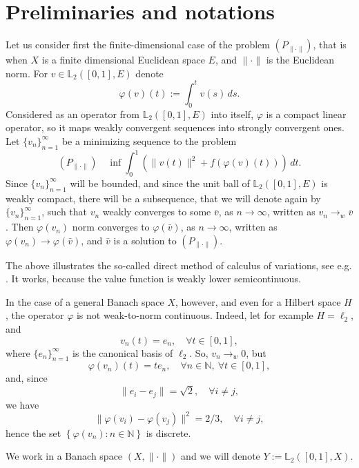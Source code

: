 \documentclass[12pt,leqno]{article}
\theoremstyle{definition}
\theoremstyle{remark}
\def\L{\mathbb{L}}
\begin{document}
 \section{Preliminaries and notations}\label{sec:prelim}


Let us consider first the finite-dimensional case of the problem  $\left(P_{\|\cdot\|}\right)$, that is when $X$ is a finite dimensional Euclidean space $E$,  and $\|\cdot\|$ is the Euclidean norm.
For $v\in  \L_2([0,1], E)$ denote
$$
  \varphi (v)(t):=\int_0^t v(s) \, ds.
$$
Considered as an operator from $\L_2([0,1], E)$ into itself, $\varphi$ is  a compact linear operator, so it maps weakly convergent sequences into strongly convergent ones. Let $\{v_n\}_{n=1}^{\infty}$ be a minimizing sequence to the problem
$$
\left(P_{\|\cdot\|}\right)\quad  \inf \int_0^1 (\|v(t)\|^2+f(\varphi(v)(t))) \, dt .
$$
Since $\{v_n\}_{n=1}^{\infty}$ will be bounded, and since the unit ball of $\L_2([0,1], E)$ is weakly compact, there will be  a subsequence,  that we will denote again by $\{v_n\}_{n=1}^{\infty}$, such that $v_n$ weakly converges to some $\bar v$, as $n \rightarrow \infty$, written as $v_n\to_w \bar v$. Then $\varphi (v_n) $ norm converges to $\varphi(\bar v)$,  as $n \rightarrow \infty$, written as
$
    \varphi (v_n) \rightarrow \varphi(\bar v)$,
and $\bar v$ is a solution to $(P_{\| \cdot \|})$.

\medskip

The above illustrates the so-called direct method of calculus of variations, see e.g. \cite{clarke_functional_analysis,dacorogna_direct_methods,giusti_direct_methods}. It works, because the value function is weakly lower semicontinuous.

In the case of a general Banach space $X$, however, and even for a Hilbert space $H$,  the operator $\varphi$ is not weak-to-norm continuous.
Indeed, let for example  $H=\ell_2$, and
$$
    v_n(t)=e_n, \quad \forall t \in[0,1],
$$
where $\{e_n\}_{n=1}^\infty$ is the canonical basis of $\ell_2$.
So,  $v_n \to_w 0$, but
$$
    \varphi(v_n)(t)=t e_n, \quad \forall n \in \mathbb{N},\ \forall t\in[0,1],
$$
and, since
$$
    \|e_i-e_j\|=\sqrt{2}, \quad \forall i \neq j,
$$
we have
$$
   \|\varphi(v_i)-\varphi(v_j)\|^2=2/3, \quad \forall i \neq j,
$$
hence the set $\left\{\varphi\left(v_n\right): n \in \mathbb{N}\right\}$ is discrete.

\bigskip


 We work in a Banach space $(X,\|\cdot\|)$ and we will denote $
    Y := \L_2([0,1],X)$.
\end{document}
